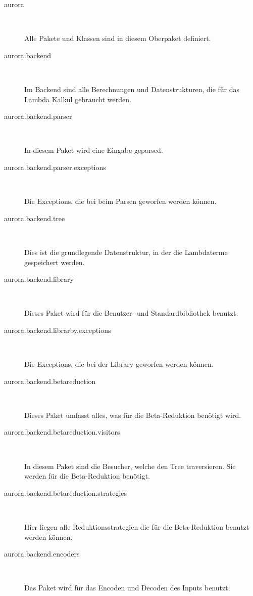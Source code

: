 \documentclass[parskip=full,11pt,twoside]{scrbook}
\begin{document}
\begin{description}
	
	
	\item[aurora] ~\par
	Alle Pakete und Klassen sind in diesem Oberpaket definiert.
	
	\item[aurora.backend] ~\par
	Im Backend sind alle Berechnungen und Datenstrukturen, die für das Lambda Kalkül gebraucht werden. 
	
	\item[aurora.backend.parser] ~\par
	In diesem Paket wird eine Eingabe geparsed.
	
	\item[aurora.backend.parser.exceptions] ~\par
	Die Exceptions, die bei beim Parsen geworfen werden können.
	
	\item[aurora.backend.tree] ~\par
	Dies ist die grundlegende Datenstruktur, in der die Lambdaterme gespeichert werden.
	
	\item[aurora.backend.library] ~\par
	Dieses Paket wird für die Benutzer- und Standardbibliothek benutzt.
	
	\item[aurora.backend.librarby.exceptions] ~\par
	Die Exceptions, die bei der Library geworfen werden können.
	
	\item[aurora.backend.betareduction] ~\par
	Dieses Paket umfasst alles, was für die Beta-Reduktion benötigt wird.
	
	\item[aurora.backend.betareduction.visitors] ~\par
	In diesem Paket sind die Besucher, welche den Tree traversieren.
	Sie werden für die Beta-Reduktion benötigt.
	
	\item[aurora.backend.betareduction.strategies] ~\par
	Hier liegen alle Reduktionsstrategien die für die Beta-Reduktion benutzt werden können.
	
	\item[aurora.backend.encoders] ~\par
	Das Paket wird für das Encoden und Decoden des Inputs benutzt.
	

\end{description}
\end{document}
